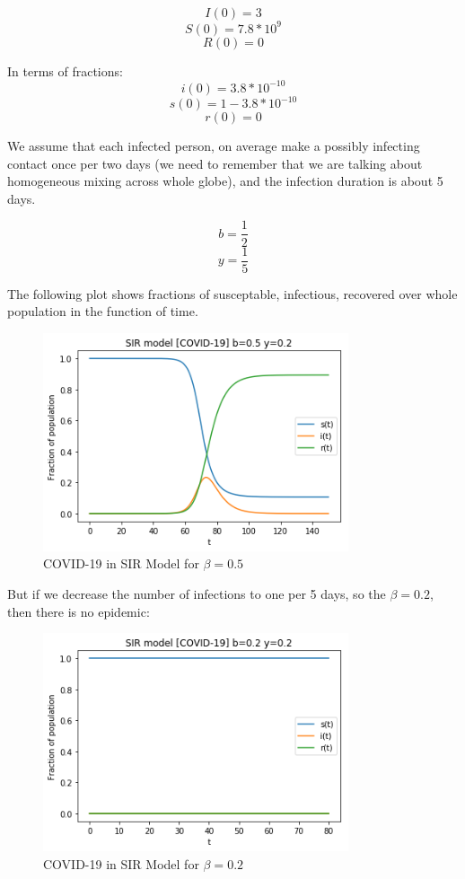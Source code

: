 \documentclass[nostrict]{szablonPG}
\begin{document}
\[I(0) = 3\]
\[S(0) = 7.8 * 10^9\]
\[R(0) = 0\]

In terms of fractions:
\[i(0) = 3.8 * 10^{-10}\]
\[s(0) = 1 - 3.8 * 10^{-10}\]
\[r(0) = 0\]

We assume that each infected person, on average make a possibly infecting contact once per two days (we need to remember that we are talking about homogeneous mixing across whole globe), and the infection duration is about 5 days. 

\[b = \frac{1}{2}\]
\[y = \frac{1}{5}\]

The following plot shows fractions of susceptable, infectious, recovered over whole population in the function of time.

\begin{figure}[ht]
\includegraphics[width=9cm]{img/covidb12y15.png}
\centering
\caption{COVID-19 in SIR Model for $\beta=0.5$}
\label{fig:covid1}
\end{figure} 


But if we decrease the number of infections to one per 5 days, so the $\beta = 0.2$, then there is no epidemic:

\begin{figure}[ht]
    \includegraphics[width=9cm]{img/covidb15y15.png}
    \centering
    \caption{COVID-19 in SIR Model for $\beta=0.2$}
    \label{fig:covid3}
\end{figure} 
\end{document}
